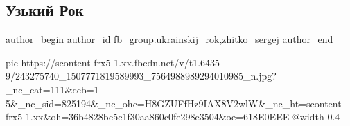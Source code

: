  
 
 
 
 
 
\subsection{Узький Рок}
\label{sec:14_10_2021.fb.fb_group.ukrainskij_rok.1.uzkij_rok}
 
\ifcmt
 author_begin
   author_id fb_group.ukrainskij_rok,zhitko_sergej
 author_end
\fi

\ifcmt
  pic https://scontent-frx5-1.xx.fbcdn.net/v/t1.6435-9/243275740_1507771819589993_7564988989294010985_n.jpg?_nc_cat=111&ccb=1-5&_nc_sid=825194&_nc_ohc=H8GZUFfHz9IAX8V2wlW&_nc_ht=scontent-frx5-1.xx&oh=36b4828be5c1f30aa860c0fe298e3504&oe=618E0EEE
  @width 0.4
\fi

